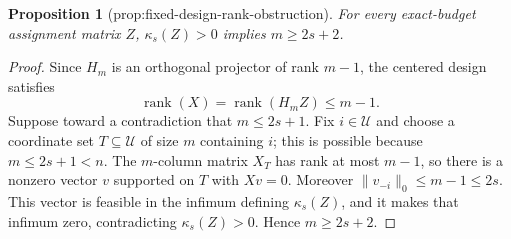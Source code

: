 \documentclass{article}
\newtheorem{proposition}{Proposition}
\begin{document}
\begin{proposition}[prop:fixed-design-rank-obstruction]\label{prop:fixed-design-rank-obstruction}
For every exact-budget assignment matrix \(Z\), \(\kappa_s(Z)>0\) implies \(m\ge2s+2\).
\end{proposition}
\begin{proof}
Since \(H_m\) is an orthogonal projector of rank \(m-1\), the centered design satisfies
\[
 \operatorname{rank}(X)=\operatorname{rank}(H_mZ)\le m-1.
\]
Suppose toward a contradiction that \(m\le2s+1\).  Fix \(i\in\mathcal U\) and choose a coordinate set \(T\subseteq\mathcal U\) of size \(m\) containing \(i\); this is possible because \(m\le2s+1<n\).  The \(m\)-column matrix \(X_T\) has rank at most \(m-1\), so there is a nonzero vector \(v\) supported on \(T\) with \(Xv=0\).  Moreover \(\lVert v_{-i}\rVert_0\le m-1\le2s\).  This vector is feasible in the infimum defining \(\kappa_s(Z)\), and it makes that infimum zero, contradicting \(\kappa_s(Z)>0\).  Hence \(m\ge2s+2\).
\end{proof}
\end{document}
